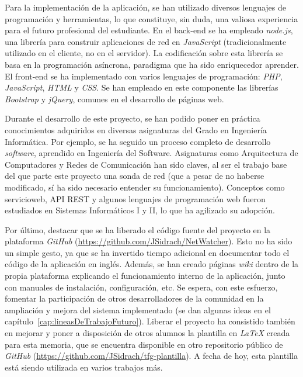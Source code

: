 Para la implementación de la aplicación, se han utilizado diversos lenguajes de programación y herramientas, lo que constituye, sin duda, una valiosa experiencia para el futuro profesional del estudiante.
En el \gls{back-end} se ha empleado \textit{node.js}, una librería para construir aplicaciones de red en \textit{JavaScript} (tradicionalmente utilizado en el cliente, no en el servidor).
La codificación sobre esta librería se basa en la programación asíncrona, paradigma que ha sido enriquecedor aprender.
El \gls{front-end} se ha implementado con varios lenguajes de programación: \textit{PHP}, \textit{JavaScript}, \textit{HTML} y \textit{CSS}.
Se han empleado en este componente las librerías \textit{Bootstrap} y \textit{jQuery}, comunes en el desarrollo de páginas web.

Durante el desarrollo de este proyecto, se han podido poner en práctica conocimientos adquiridos en diversas asignaturas del Grado en Ingeniería Informática.
Por ejemplo, se ha seguido un proceso completo de desarrollo \textit{software}, aprendido en Ingeniería del Software.
Asignaturas como Arquitectura de Computadores y Redes de Comunicación han sido claves, al ser el trabajo base del que parte este proyecto una sonda de red (que a pesar de no haberse modificado, sí ha sido necesario entender su funcionamiento).
Conceptos como \gls{servicioweb}, \gls{API} \gls{REST} y algunos lenguajes de programación web fueron estudiados en Sistemas Informáticos I y II, lo que ha agilizado su adopción.

Por último, destacar que se ha liberado el código fuente del proyecto en la plataforma \textit{GitHub} (\url{https://github.com/JSidrach/NetWatcher}).
Esto no ha sido un simple gesto, ya que se ha invertido tiempo adicional en documentar todo el código de la aplicación en inglés.
Además, se han creado páginas \textit{wiki} dentro de la propia plataforma explicando el funcionamiento interno de la aplicación, junto con manuales de instalación, configuración, etc.
Se espera, con este esfuerzo, fomentar la participación de otros desarrolladores de la comunidad en la ampliación y mejora del sistema implementado (se dan algunas ideas en el capítulo~\ref{cap:lineasDeTrabajoFuturo}).
Liberar el proyecto ha consistido también en mejorar y poner a disposición de otros alumnos la plantilla en \textit{LaTeX} creada para esta memoria, que se encuentra disponible en otro repositorio público de \textit{GitHub} (\url{https://github.com/JSidrach/tfg-plantilla}).
A fecha de hoy, esta plantilla está siendo utilizada en varios trabajos más.

